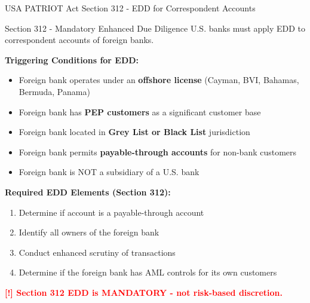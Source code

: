 \documentclass[11pt,a4paper]{beamer}
\newcommand{\redflag}[1]{\textcolor{red}{\textbf{[!] #1}}}
\begin{document}
\begin{frame}{USA PATRIOT Act Section 312 - EDD for Correspondent Accounts}
\begin{block}{Section 312 - Mandatory Enhanced Due Diligence}
U.S. banks must apply EDD to correspondent accounts of foreign banks.
\end{block}
\textbf{Triggering Conditions for EDD:}
\begin{itemize}
\item Foreign bank operates under an \textbf{offshore license} (Cayman, BVI, Bahamas, Bermuda, Panama)
\item Foreign bank has \textbf{PEP customers} as a significant customer base
\item Foreign bank located in \textbf{Grey List or Black List} jurisdiction
\item Foreign bank permits \textbf{payable-through accounts} for non-bank customers
\item Foreign bank is NOT a subsidiary of a U.S. bank
\end{itemize}
\textbf{Required EDD Elements (Section 312):}
\begin{enumerate}
\item Determine if account is a payable-through account
\item Identify all owners of the foreign bank
\item Conduct enhanced scrutiny of transactions
\item Determine if the foreign bank has AML controls for its own customers
\end{enumerate}
\redflag{Section 312 EDD is MANDATORY - not risk-based discretion.}
\end{frame}

\end{document}
